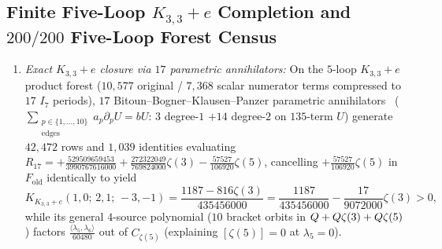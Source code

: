 \subsection{Finite Five-Loop \texorpdfstring{$K_{3,3}+e$}{K\_\{3,3\}+e} Completion and \texorpdfstring{$200/200$}{200/200} Five-Loop Forest Census}
\label{subsec:k33e-and-census}

\begin{theorem}
\label{thm:k33e-completion}
\leavevmode
\begin{enumerate}[label=(\arabic*),leftmargin=*]
  \item \emph{Exact $K_{3,3}+e$ closure via $17$ parametric annihilators:} On the $5$-loop $K_{3,3}+e$ product forest ($10{,}577$ original / $7{,}368$ scalar numerator terms compressed to $17$ $I_7$ periods), $17$ Bitoun--Bogner--Klausen--Panzer parametric annihilators~\cite{BBKP18} ($\sum_{\substack{p\in\{1,\dots,10\}\\\mathrm{edges}}}a_p\partial_p U = bU$: $3$ degree-$1$ $+ 14$ degree-$2$ on $135$-term $U$) generate $42{,}472$ rows and $1{,}039$ identities evaluating $R_{17} = +\frac{529509659453}{3990767616000} + \frac{272322049}{769824000}\zeta(3) - \frac{57527}{106920}\zeta(5)$, cancelling $+\frac{57527}{106920}\zeta(5)$ in $F_{\mathrm{old}}$ identically to yield
  \begin{equation}
  \label{eq:k33e-1187-exact}
  K_{K_{3,3}+e}(1,0;\,2,1;\,-3,-1) = \frac{1187 - 816\zeta(3)}{435456000} = \frac{1187}{435456000} - \frac{17}{9072000}\zeta(3) > 0,
  \end{equation}
  while its general $4$-source polynomial ($10$ bracket orbits in $Q+Q\zeta(3)+Q\zeta(5)$) factors $\frac{\langle\lambda_5,\lambda_6\rangle}{60480}$ out of $C_{\zeta(5)}$ (explaining $[\zeta(5)] = 0$ at $\lambda_5=0$).


\end{enumerate}
\end{theorem}
